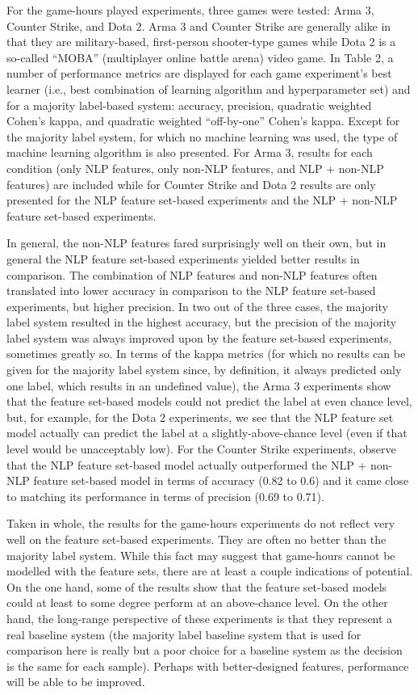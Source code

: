 \documentclass[9pt]{article}
\begin{document}
For the game-hours played experiments, three games were tested: Arma 3, Counter Strike, and Dota 2. Arma 3 and Counter Strike are generally alike in that they are military-based, first-person shooter-type games while Dota 2 is a so-called ``MOBA'' (multiplayer online battle arena) video game. In Table 2, a number of performance metrics are displayed for each game experiment's best learner (i.e., best combination of learning algorithm and hyperparameter set) and for a majority label-based system: accuracy, precision, quadratic weighted Cohen's kappa, and quadratic weighted ``off-by-one'' Cohen's kappa. Except for the majority label system, for which no machine learning was used, the type of machine learning algorithm is also presented. For Arma 3, results for each condition (only NLP features, only non-NLP features, and NLP + non-NLP features) are included while for Counter Strike and Dota 2 results are only presented for the NLP feature set-based experiments and the NLP + non-NLP feature set-based experiments.

In general, the non-NLP features fared surprisingly well on their own, but in general the NLP feature set-based experiments yielded better results in comparison. The combination of NLP features and non-NLP features often translated into lower accuracy in comparison to the NLP feature set-based experiments, but higher precision. In two out of the three cases, the majority label system resulted in the highest accuracy, but the precision of the majority label system was always improved upon by the feature set-based experiments, sometimes greatly so. In terms of the kappa metrics (for which no results can be given for the majority label system since, by definition, it always predicted only one label, which results in an undefined value), the Arma 3 experiments show that the feature set-based models could not predict the label at even chance level, but, for example, for the Dota 2 experiments, we see that the NLP feature set model actually can predict the label at a slightly-above-chance level (even if that level would be unacceptably low). For the Counter Strike experiments, observe that the NLP feature set-based model actually outperformed the NLP + non-NLP feature set-based model in terms of accuracy (0.82 to 0.6) and it came close to matching its performance in terms of precision (0.69 to 0.71).

Taken in whole, the results for the game-hours experiments do not reflect very well on the feature set-based experiments. They are often no better than the majority label system. While this fact may suggest that game-hours cannot be modelled with the feature sets, there are at least a couple indications of potential. On the one hand, some of the results show that the feature set-based models could at least to some degree perform at an above-chance level. On the other hand, the long-range perspective of these experiments is that they represent a real baseline system (the majority label baseline system that is used for comparison here is really but a poor choice for a baseline system as the decision is the same for each sample). Perhaps with better-designed features, performance will be able to be improved.
\end{document}

